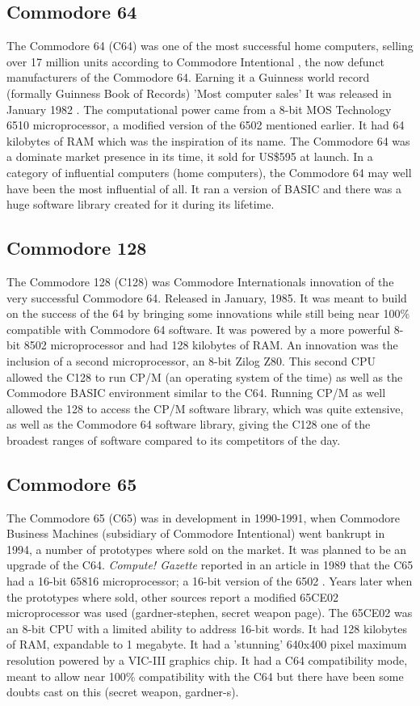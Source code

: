 \subsection{Commodore 64}
The Commodore 64 (C64) was one of the most successful home computers, selling over 17 million units according to Commodore Intentional \cite{pagetable}, the now defunct manufacturers of the Commodore 64. Earning it  a Guinness world record (formally Guinness Book of Records) 'Most computer sales' \cite{guinness}
It was released in January 1982 \cite{infoworld82}. The computational power came from a 8-bit MOS Technology 6510 microprocessor, a modified version of the 6502 mentioned earlier. It had 64 kilobytes of RAM which was the inspiration of its name. The Commodore 64 was a dominate market presence in its time, it sold for US\$595 at launch. In a category of influential computers (home computers), the Commodore 64 may well have been the most influential of all. It ran a version of BASIC and there was a huge software library created for it during its lifetime.

\subsection{Commodore 128}
The Commodore 128 (C128) was Commodore Internationals innovation of the very successful Commodore 64. Released in January, 1985. It was meant to build on the success of the 64 by bringing some innovations while still being near 100\% compatible with Commodore 64 software. It was powered by a more powerful 8-bit 8502 microprocessor and had 128 kilobytes of RAM. An innovation was the inclusion of a second microprocessor, an 8-bit Zilog Z80. This second CPU allowed the C128 to run CP/M (an operating system of the time) as well as the Commodore BASIC environment similar to the C64. Running CP/M as well allowed the 128 to access the CP/M software library, which was quite extensive, as well as the Commodore 64 software library, giving the C128 one of the broadest ranges of software compared to its competitors of the day.

\subsection{Commodore 65}
The Commodore 65 (C65) was in development in 1990-1991, when Commodore Business Machines (subsidiary of Commodore Intentional) went bankrupt in 1994, a number of prototypes where sold on the market. It was planned to be an upgrade of the C64. \textit{Compute! Gazette} reported in an article in 1989 that the C65 had a 16-bit 65816 microprocessor; a 16-bit version of the 6502 \cite{gazette89}. Years later when the prototypes where sold, other sources report a modified 65CE02 microprocessor was used (gardner-stephen, secret weapon page). The 65CE02 was an 8-bit CPU with a limited ability to address 16-bit words. It had 128 kilobytes of RAM, expandable to 1 megabyte. It had a 'stunning' 640x400 pixel maximum resolution \cite{gazette89} powered by a VIC-III graphics chip. It had a C64 compatibility mode, meant to allow near 100\% compatibility with the C64 but there have been some doubts cast on this (secret weapon, gardner-s). 

